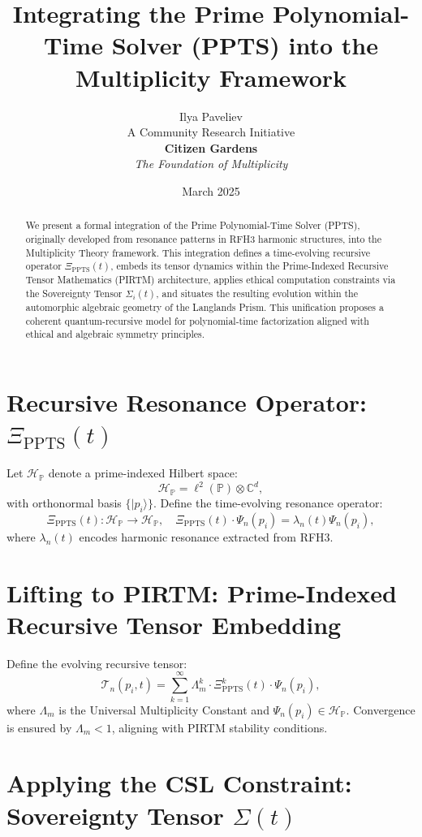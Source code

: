\documentclass[11pt]{article}
\title{Integrating the Prime Polynomial-Time Solver (PPTS) into the Multiplicity Framework}
\author{Ilya Paveliev\\ A Community Research Initiative \\ \textbf{ Citizen Gardens} \\ \textit {The Foundation of Multiplicity}}
\date{March 2025}
\begin{document}
\maketitle

\begin{abstract}
We present a formal integration of the Prime Polynomial-Time Solver (PPTS), originally developed from resonance patterns in RFH3 harmonic structures, into the Multiplicity Theory framework. This integration defines a time-evolving recursive operator \(\Xi_{\text{PPTS}}(t)\), embeds its tensor dynamics within the Prime-Indexed Recursive Tensor Mathematics (PIRTM) architecture, applies ethical computation constraints via the Sovereignty Tensor \(\Sigma_i(t)\), and situates the resulting evolution within the automorphic algebraic geometry of the Langlands Prism. This unification proposes a coherent quantum-recursive model for polynomial-time factorization aligned with ethical and algebraic symmetry principles.
\end{abstract}

\section{Recursive Resonance Operator: \(\Xi_{\text{PPTS}}(t)\)}

Let \(\mathcal{H}_\mathbb{P}\) denote a prime-indexed Hilbert space:
\[
\mathcal{H}_\mathbb{P} = \ell^2(\mathbb{P}) \otimes \mathbb{C}^d,
\]
with orthonormal basis \(\{ |p_i\rangle \}\). Define the time-evolving resonance operator:
\[
\Xi_{\text{PPTS}}(t) : \mathcal{H}_\mathbb{P} \to \mathcal{H}_\mathbb{P}, \quad \Xi_{\text{PPTS}}(t) \cdot \Psi_n(p_i) = \lambda_n(t) \Psi_n(p_i),
\]
where \(\lambda_n(t)\) encodes harmonic resonance extracted from RFH3.

\section{Lifting to PIRTM: Prime-Indexed Recursive Tensor Embedding}

Define the evolving recursive tensor:
\[
\mathcal{T}_n(p_i, t) = \sum_{k=1}^{\infty} \Lambda_m^k \cdot \Xi_{\text{PPTS}}^k(t) \cdot \Psi_n(p_i),
\]
where \(\Lambda_m\) is the Universal Multiplicity Constant and \(\Psi_n(p_i) \in \mathcal{H}_\mathbb{P}\). Convergence is ensured by \(\Lambda_m < 1\), aligning with PIRTM stability conditions.

\section{Applying the CSL Constraint: Sovereignty Tensor \(\Sigma(t)\)}
\end{document}
